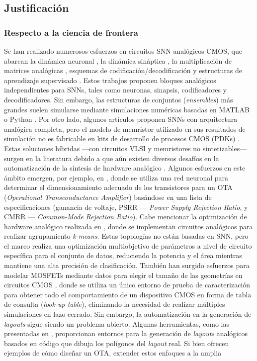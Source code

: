 \documentclass[letter, 12pt]{article}
\begin{document}
\subsection{Justificación}
\subsubsection{Respecto a la ciencia de frontera}
Se han realizado numerosos esfuerzos en circuitos SNN analógicos CMOS, que abarcan la dinámica neuronal \cite{Hazan2021}, la dinámica sináptica \cite{Zhang2022, Pereira2023}, la multiplicación de matrices analógicas \cite{Parmar2023, Sun2022, Feinberg2021, Xia2019,Zuo2025}, esquemas de codificación/decodificación \cite{Yi2023} y estructuras de aprendizaje supervisado \cite{Vlasov2023, Liu2022, Mayr2014}. Estos trabajos proponen bloques analógicos independientes para SNNs, tales como neuronas, sinapsis, codificadores y decodificadores. Sin embargo, las estructuras de conjuntos (\textit{ensembles}) más grandes suelen simularse mediante simulaciones numéricas basadas en MATLAB o Python \cite{Niedermeier_2025, TorresChavez2025}. Por otro lado, algunos artículos proponen SNNs con arquitectura analógica completa, pero el modelo de memristor utilizado en sus resultados de simulación no es fabricable en kits de desarrollo de procesos CMOS (PDKs) \cite{Vlasov2023, 9937639}. Estas soluciones híbridas —con circuitos VLSI y memristores no sintetizables— surgen en la literatura debido a que aún existen diversos desafíos en la automatización de la síntesis de hardware analógico \cite{11576581}. Algunos esfuerzos en este ámbito emergen, por ejemplo, en \cite{Li2023}, donde se utiliza una red neuronal para determinar el dimensionamiento adecuado de los transistores para un OTA (\textit{Operational Transconductance Amplifier}) basándose en una lista de especificaciones (ganancia de voltaje, PSRR — \textit{Power Supply Rejection Ratio}, y CMRR — \textit{Common-Mode Rejection Ratio}). Cabe mencionar la optimización de hardware analógico realizada en \cite{11534092}, donde se implementan circuitos analógicos para realizar agrupamiento \textit{k-means}. Estas topologías no están basadas en SNN, pero el marco realiza una optimización multiobjetivo de parámetros a nivel de circuito específica para el conjunto de datos, reduciendo la potencia y el área mientras mantiene una alta precisión de clasificación. También han surgido esfuerzos para modelar MOSFETs mediante datos para elegir el tamaño de las geometrías en circuitos CMOS \cite{Zhang2026,Jespers_Murmann_2017}, donde se utiliza un único entorno de prueba de caracterización para obtener todo el comportamiento de un dispositivo CMOS en forma de tabla de consulta (\textit{look-up table}), eliminando la necesidad de realizar múltiples simulaciones en lazo cerrado. Sin embargo, la automatización en la generación de \textit{layouts} sigue siendo un problema abierto. Algunas herramientas, como las presentadas en \cite{Hammoud2024, LinanCembrano2024}, proporcionan entornos para la generación de \textit{layouts} analógicos basados en código que dibuja los polígonos del \textit{layout} real. Si bien ofrecen ejemplos de cómo diseñar un OTA, extender estos enfoques a la amplia 
\end{document}
